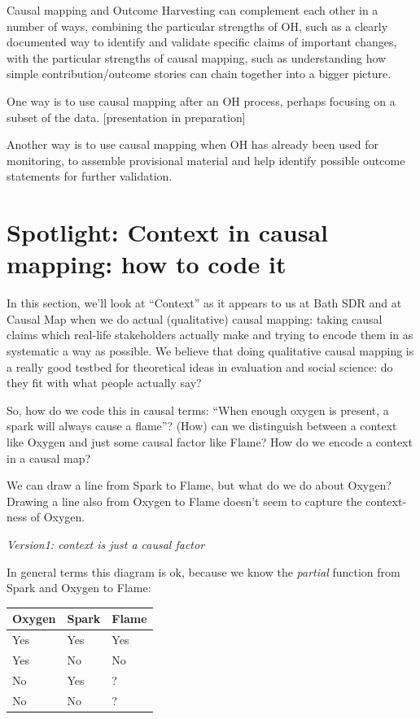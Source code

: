 \documentclass[
]{book}
\begin{document}
Causal mapping and Outcome Harvesting can complement each other in a number of ways, combining the particular strengths of OH, such as a clearly documented way to identify and validate specific claims of important changes, with the particular strengths of causal mapping, such as understanding how simple contribution/outcome stories can chain together into a bigger picture.

One way is to use causal mapping after an OH process, perhaps focusing on a subset of the data. {[}presentation in preparation{]}

Another way is to use causal mapping when OH has already been used for monitoring, to assemble provisional material and help identify possible outcome statements for further validation.

\hypertarget{spotlight-context-in-causal-mapping-how-to-code-it}{%
\chapter{Spotlight: Context in causal mapping: how to code it}\label{spotlight-context-in-causal-mapping-how-to-code-it}}

In this section, we'll look at ``Context'' as it appears to us at Bath SDR and at Causal Map when we do actual (qualitative) causal mapping: taking causal claims which real-life stakeholders actually make and trying to encode them in as systematic a way as possible. We believe that doing qualitative causal mapping is a really good testbed for theoretical ideas in evaluation and social science: do they fit with what people actually say?

So, how do we code this in causal terms: ``When enough oxygen is present, a spark will always cause a flame''? (How) can we distinguish between a context like Oxygen and just some causal factor like Flame? How do we encode a context in a causal map?

We can draw a line from Spark to Flame, but what do we do about Oxygen? Drawing a line also from Oxygen to Flame doesn't seem to capture the context-ness of Oxygen.

\emph{Version1: context is just a causal factor}

In general terms this diagram is ok, because we know the \emph{partial} function from Spark and Oxygen to Flame:

\begin{longtable}[]{@{}lll@{}}
\toprule
Oxygen & Spark & Flame\tabularnewline
\midrule
\endhead
Yes & Yes & Yes\tabularnewline
Yes & No & No\tabularnewline
No & Yes & ?\tabularnewline
No & No & ?\tabularnewline
\bottomrule
\end{longtable}
\end{document}
